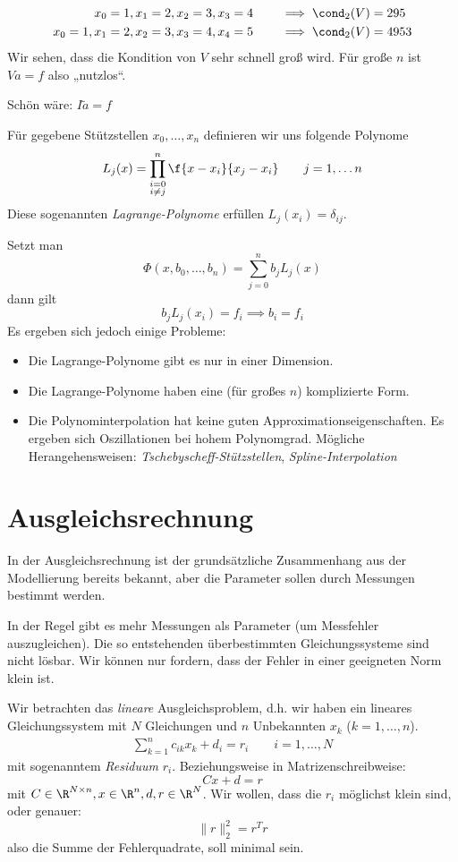 \documentclass{mycourse}
\begin{document}
\begin{ex*}
	\begin{align*}
		x_0=1, x_1= 2, x_2 = 3, x_3 = 4 \qquad &\implies \cond_2(V) = 295\\
		x_0=1, x_1= 2, x_2 = 3, x_3 = 4, x_4 = 5 \qquad &\implies \cond_2(V) = 4953
	\end{align*}
	Wir sehen, dass die Kondition von $V$ sehr schnell groß wird.
	Für große $n$ ist $Va=f$ also „nutzlos“.

	Schön wäre: $I\tilde a = f$
\end{ex*}

Für gegebene Stützstellen $x_0,\dotsc, x_n$ definieren wir uns folgende Polynome
\begin{align*}
	L_j(x) = \prod_{\substack{i=0\\i\neq j}}^n \f {x-x_i}{x_j-x_i} \qquad j=1,\dotsc n
\end{align*}
Diese sogenannten \emph{Lagrange-Polynome} erfüllen $L_j(x_i) = \delta_{ij}$.

Setzt man
\[
	\Phi(x, b_0,\dotsc, b_n) = \sum_{j=0}^n b_jL_j(x)
\]
dann gilt
\[
	b_jL_j(x_i) = f_i \implies b_i = f_i
\]
Es ergeben sich jedoch einige Probleme:
\begin{itemize}
	\item
		Die Lagrange-Polynome gibt es nur in einer Dimension.
	\item
		Die Lagrange-Polynome haben eine (für großes $n$) komplizierte Form.
	\item
		Die Polynominterpolation hat keine guten Approximationseigenschaften.
		Es ergeben sich Oszillationen bei hohem Polynomgrad.
		Mögliche Herangehensweisen:	\emph{Tschebyscheff-Stützstellen}, \emph{Spline-Interpolation}
\end{itemize}

\section{Ausgleichsrechnung}

In der Ausgleichsrechnung ist der grundsätzliche Zusammenhang aus der Modellierung bereits bekannt, aber die Parameter sollen durch Messungen bestimmt werden.

In der Regel gibt es mehr Messungen als Parameter (um Messfehler auszugleichen).
Die so entstehenden überbestimmten Gleichungssysteme sind nicht lösbar.
Wir können nur fordern, dass der Fehler in einer geeigneten Norm klein ist.

Wir betrachten das \emph{lineare} Ausgleichsproblem, d.h. wir haben ein lineares Gleichungssystem mit $N$ Gleichungen und $n$ Unbekannten $x_k$ ($k=1,\dotsc,n$).
\begin{align}
	\label{eq:5.3}
	\sum_{k=1}^n c_{ik}x_k + d_i = r_i
	\qquad i=1,\dotsc, N
\end{align}
mit sogenanntem \emph{Residuum} $r_i$.
Beziehungsweise in Matrizenschreibweise:
\[
	Cx + d = r
\]
mit $C\in \R^{N\times n}, x\in \R^n, d,r\in \R^N$.
Wir wollen, dass die $r_i$ möglichst klein sind, oder genauer:
\[
	\|r\|_2^2 = r^Tr
\]
also die Summe der Fehlerquadrate, soll minimal sein.
\end{document}
